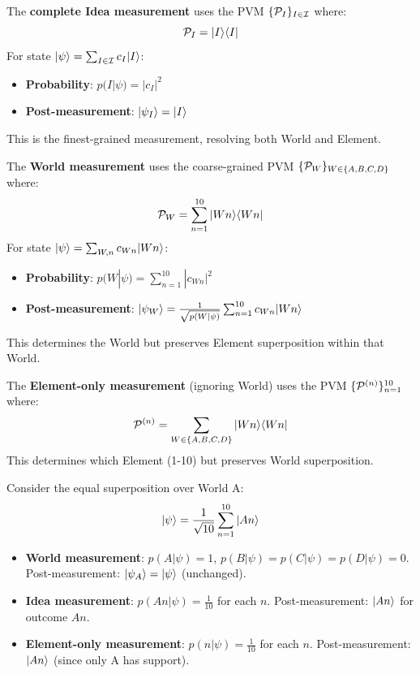 \begin{definition}
\label{def:idea-measurement}
The \textbf{complete Idea measurement} uses the PVM $\{\mathcal{P}_I\}_{I \in \mathcal{I}}$ where:
\[
\mathcal{P}_I = |I\rangle\langle I|
\]
For state $|\psi\rangle = \sum_{I \in \mathcal{I}} c_I |I\rangle$:
\begin{itemize}
  \item \textbf{Probability}: $p(I|\psi) = |c_I|^2$
  \item \textbf{Post-measurement}: $|\psi_I\rangle = |I\rangle$
\end{itemize}
This is the finest-grained measurement, resolving both World and Element.
\end{definition}

\begin{definition}
\label{def:world-measurement-v73}
The \textbf{World measurement} uses the coarse-grained PVM $\{\mathcal{P}_W\}_{W \in \{A,B,C,D\}}$ where:
\[
\mathcal{P}_W = \sum_{n=1}^{10} |Wn\rangle\langle Wn|
\]
For state $|\psi\rangle = \sum_{W,n} c_{Wn} |Wn\rangle$:
\begin{itemize}
  \item \textbf{Probability}: $p(W|\psi) = \sum_{n=1}^{10} |c_{Wn}|^2$
  \item \textbf{Post-measurement}: $|\psi_W\rangle = \frac{1}{\sqrt{p(W|\psi)}} \sum_{n=1}^{10} c_{Wn} |Wn\rangle$
\end{itemize}
This determines the World but preserves Element superposition within that World.
\end{definition}

\begin{definition}
\label{def:element-only-measurement}
The \textbf{Element-only measurement} (ignoring World) uses the PVM $\{\mathcal{P}^{(n)}\}_{n=1}^{10}$ where:
\[
\mathcal{P}^{(n)} = \sum_{W \in \{A,B,C,D\}} |Wn\rangle\langle Wn|
\]
This determines which Element (1-10) but preserves World superposition.
\end{definition}

\begin{example}
\label{ex:measuring-superposition}
Consider the equal superposition over World A:
\[
|\psi\rangle = \frac{1}{\sqrt{10}} \sum_{n=1}^{10} |An\rangle
\]
\begin{itemize}
  \item \textbf{World measurement}: $p(A|\psi) = 1$, $p(B|\psi) = p(C|\psi) = p(D|\psi) = 0$. Post-measurement: $|\psi_A\rangle = |\psi\rangle$ (unchanged).

  \item \textbf{Idea measurement}: $p(An|\psi) = \frac{1}{10}$ for each $n$. Post-measurement: $|An\rangle$ for outcome $An$.

  \item \textbf{Element-only measurement}: $p(n|\psi) = \frac{1}{10}$ for each $n$. Post-measurement: $|An\rangle$ (since only A has support).
\end{itemize}
\end{example}


